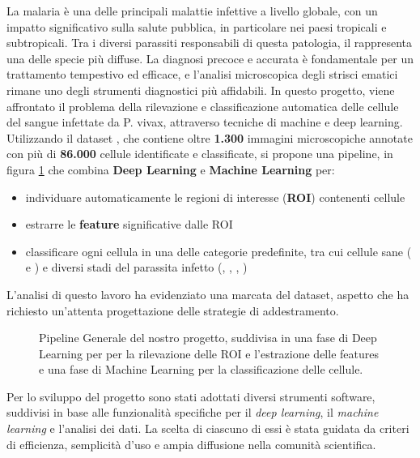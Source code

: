 \documentclass[minted, draw]{../tex/hebdomon}
\begin{document}
La malaria è una delle principali malattie infettive a livello globale, con un impatto significativo sulla salute pubblica, in particolare nei paesi tropicali e subtropicali. Tra i diversi parassiti responsabili di questa patologia, il  rappresenta una delle specie più diffuse. La diagnosi precoce e accurata è fondamentale per un trattamento tempestivo ed efficace, e l’analisi microscopica degli strisci ematici rimane uno degli strumenti diagnostici più affidabili.
In questo progetto, viene affrontato il problema della rilevazione e classificazione automatica delle cellule del sangue infettate da P. vivax, attraverso tecniche di machine e deep learning.
Utilizzando il dataset , che contiene oltre \textbf{1.300} immagini microscopiche annotate con più di \textbf{86.000} cellule identificate e classificate, si propone una pipeline, in figura \ref{fig:pipeline_general} che combina \textbf{Deep Learning} e \textbf{Machine Learning} per:

\begin{itemize}
	\item individuare automaticamente le regioni di interesse (\textbf{ROI}) contenenti cellule
	\item estrarre le \textbf{feature} significative dalle ROI
	\item classificare ogni cellula in una delle categorie predefinite, tra cui cellule sane ( e ) e diversi stadi del parassita infetto (, , , )
\end{itemize}

\begin{warning}
	L’analisi di questo lavoro ha evidenziato una marcata  del dataset, aspetto che ha richiesto un’attenta progettazione delle strategie di addestramento.
\end{warning}
%
\begin{figure}[ht]
	\centering
	
	\caption{Pipeline Generale del nostro progetto, suddivisa in una fase di Deep Learning per per la rilevazione delle ROI e l'estrazione delle features e una fase di Machine Learning per la classificazione delle cellule.}
	\label{fig:pipeline_general}
\end{figure}
%


Per lo sviluppo del progetto sono stati adottati diversi strumenti software, suddivisi in base alle funzionalità specifiche per il \textit{deep learning}, il \textit{machine learning} e l’analisi dei dati. La scelta di ciascuno di essi è stata guidata da criteri di efficienza, semplicità d’uso e ampia diffusione nella comunità scientifica.
\end{document}
